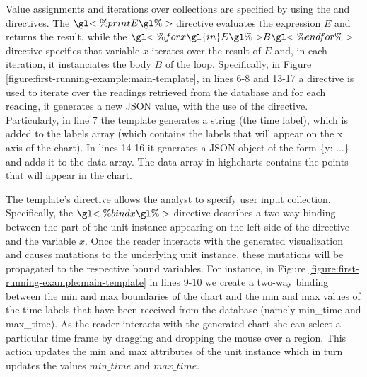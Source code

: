  Value assignments and iterations over collections are specified by using the  and  directives. The $\gl{<\% print } E \gl{ \%>}$ directive evaluates the expression $E$ and returns the result, while the $\gl{<\% for } x \gl{ in } E \gl{ \%> } B \gl{ <\% end for \%>}$ directive specifies that variable $x$ iterates over the result of $E$ and, in each iteration, it instanciates the body $B$ of the  loop. Specifically, in Figure \ref{figure:first-running-example:main-template}, in lines 6-8 and 13-17 a  directive is used to iterate over the readings retrieved from the database and for each reading, it generates a new JSON value, with the use of the  directive. Particularly, in line 7 the template generates a string (the time label), which is added to the labels array (which contains the labels that will appear on the x axis of the chart). In lines 14-16 it generates a JSON object of the form \{y: ...\} and adds it to the data array. The data array in highcharts contains the points that will appear in the chart.






 The template's  directive allows the analyst to specify user input collection. Specifically, the $\gl{<\% bind x} \gl{ \%>}$ directive describes a two-way binding between the part of the unit instance appearing on the left side of the directive and the variable $x$. Once the reader interacts with the generated visualization and causes mutations to the underlying unit instance, these mutations will be propagated to the respective bound variables. For instance, in Figure \ref{figure:first-running-example:main-template} in lines 9-10 we create a two-way binding between the min and max boundaries of the chart and the min and max values of the time labels that have been received from the database (namely min\_time and max\_time). As the reader interacts with the generated chart she can select a particular time frame by dragging and dropping the mouse over a region. This action updates the min and max attributes of the unit instance which in turn updates the values $min\_time$ and $max\_time$. 


